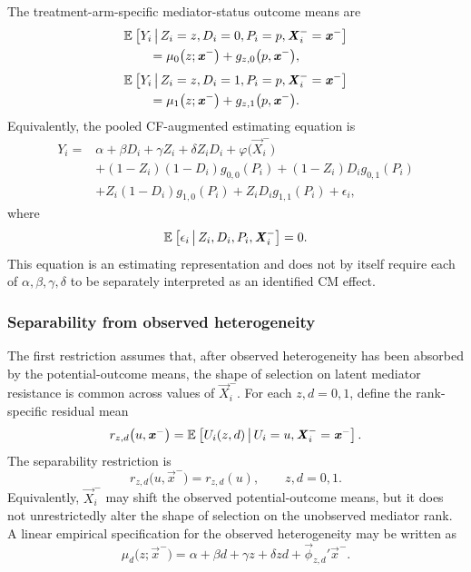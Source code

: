 The treatment-arm-specific mediator-status outcome means are
\[
    \begin{aligned}
    &\mathbb{E}_{} \left[ 
        Y_i
     \, \middle\vert \, 
        Z_i=z,
        D_i=0,
        P_i=p,
        \boldsymbol{\mathit{X}}_i^-=\boldsymbol{\mathit{x}}^-
     \right]
    \\
    &\qquad=
    \mu_0
    \big(
        z;\boldsymbol{\mathit{x}}^-
    \big)
    +
    g_{z,0}
    \big(
        p,\boldsymbol{\mathit{x}}^-
    \big),
    \end{aligned}
\]
\[
    \begin{aligned}
    &\mathbb{E}_{} \left[ 
        Y_i
     \, \middle\vert \, 
        Z_i=z,
        D_i=1,
        P_i=p,
        \boldsymbol{\mathit{X}}_i^-=\boldsymbol{\mathit{x}}^-
     \right]
    \\
    &\qquad=
    \mu_1
    \big(
        z;\boldsymbol{\mathit{x}}^-
    \big)
    +
    g_{z,1}
    \big(
        p,\boldsymbol{\mathit{x}}^-
    \big).
    \end{aligned}
\]
Equivalently, the pooled CF-augmented estimating equation is
\[
    \begin{aligned}
    Y_i
    ={}&
    \alpha
    +
    \beta D_i
    +
    \gamma Z_i
    +
    \delta Z_iD_i
    +
    \varphi
    \big(
        \vec X_i^-
    \big)
    \\
    &+
    (1-Z_i)(1-D_i)
    g_{0,0}(P_i)
    +
    (1-Z_i)D_i
    g_{0,1}(P_i)
    \\
    &+
    Z_i(1-D_i)
    g_{1,0}(P_i)
    +
    Z_iD_i
    g_{1,1}(P_i)
    +
    \epsilon_i,
    \end{aligned}
\]
where
\[
    \mathbb{E}_{} \left[ 
        \epsilon_i
     \, \middle\vert \, 
        Z_i,
        D_i,
        P_i,
        \boldsymbol{\mathit{X}}_i^-
     \right]
    =
    0.
\]
This equation is an estimating representation and does not by itself require each of $\alpha,\beta,\gamma,\delta$ to be separately interpreted as an identified CM effect.

\subsubsection{Separability from observed heterogeneity}

The first restriction assumes that, after observed heterogeneity has been absorbed by the potential-outcome means, the shape of selection on latent mediator resistance is common across values of $\vec X_i^-$.
For each $z,d=0,1$, define the rank-specific residual mean
\[
    r_{z,d}
    \big(
        u,\boldsymbol{\mathit{x}}^-
    \big)
    =
    \mathbb{E}_{} \left[ 
        U_i(z,d)
     \, \middle\vert \, 
        U_i=u,
        \boldsymbol{\mathit{X}}_i^-=\boldsymbol{\mathit{x}}^-
     \right].
\]
The separability restriction is
\[
    r_{z,d}
    \big(
        u,\vec x^-
    \big)
    =
    r_{z,d}(u),
    \qquad
    z,d=0,1.
    \label{eqn:mte-cf-separability}
\]
Equivalently, $\vec X_i^-$ may shift the observed potential-outcome means, but it does not unrestrictedly alter the shape of selection on the unobserved mediator rank.
A linear empirical specification for the observed heterogeneity may be written as
\[
    \mu_d
    \big(
        z;\vec x^-
    \big)
    =
    \alpha
    +
    \beta d
    +
    \gamma z
    +
    \delta zd
    +
    \vec\phi_{z,d}'\vec x^-.
\]

